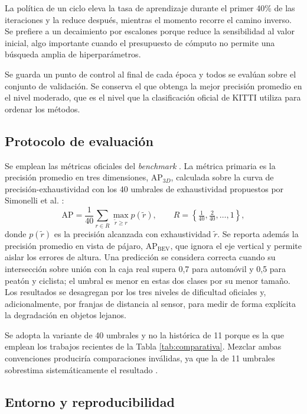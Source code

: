 \documentclass[11pt,letterpaper]{article}
\begin{document}
La política de un ciclo \cite{smith2017} eleva la tasa de aprendizaje durante el primer 40\% de las iteraciones y la reduce después, mientras el momento recorre el camino inverso. Se prefiere a un decaimiento por escalones porque reduce la sensibilidad al valor inicial, algo importante cuando el presupuesto de cómputo no permite una búsqueda amplia de hiperparámetros.

Se guarda un punto de control al final de cada época y todos se evalúan sobre el conjunto de validación. Se conserva el que obtenga la mejor precisión promedio en el nivel moderado, que es el nivel que la clasificación oficial de KITTI utiliza para ordenar los métodos.

\subsection{Protocolo de evaluación}

Se emplean las métricas oficiales del \textit{benchmark} \cite{geiger2013}. La métrica primaria es la precisión promedio en tres dimensiones, AP$_{3D}$, calculada sobre la curva de precisión-exhaustividad con los 40 umbrales de exhaustividad propuestos por Simonelli et al. \cite{simonelli2019}:
\begin{equation}
\text{AP} = \frac{1}{40}\sum_{r \in R} \max_{\tilde{r} \geq r} p(\tilde{r}), \qquad R = \left\{\tfrac{1}{40}, \tfrac{2}{40}, \dots, 1\right\},
\end{equation}
donde $p(\tilde r)$ es la precisión alcanzada con exhaustividad $\tilde r$. Se reporta además la precisión promedio en vista de pájaro, AP$_{\text{BEV}}$, que ignora el eje vertical y permite aislar los errores de altura. Una predicción se considera correcta cuando su intersección sobre unión con la caja real supera 0,7 para automóvil y 0,5 para peatón y ciclista; el umbral es menor en estas dos clases por su menor tamaño. Los resultados se desagregan por los tres niveles de dificultad oficiales y, adicionalmente, por franjas de distancia al sensor, para medir de forma explícita la degradación en objetos lejanos.

Se adopta la variante de 40 umbrales y no la histórica de 11 porque es la que emplean los trabajos recientes de la Tabla \ref{tab:comparativa}. Mezclar ambas convenciones produciría comparaciones inválidas, ya que la de 11 umbrales sobrestima sistemáticamente el resultado \cite{simonelli2019}.

\subsection{Entorno y reproducibilidad}
\end{document}
